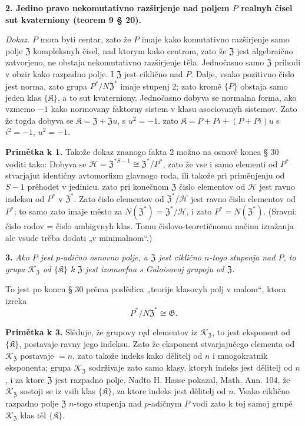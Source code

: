 \documentclass[11pt]{article}
\begin{document}
\noindent\textbf{2. Jedino pravo nekomutativno razširjenje nad poljem \(P\) realnyh čisel sut kvaterniony (teorem 9 § 20).}

\noindent\emph{Dokaz.} \(P\) mora byti centar, zato že \(P\) imaje kako komutativno razširjenje samo polje \(\mathfrak Z\) kompleksnyh čisel, nad ktorym kako centrom, zato že \(\mathfrak Z\) jest algebraično zatvorjeno, ne obstaja nekomutativno razširjenje těla. Jednočasno samo \(\mathfrak Z\) prihodi v obzir kako razpadno polje. I \(\mathfrak Z\) jest ciklično nad \(P\). Dalje, vsako pozitivno čislo jest norma, zato grupa \(P^*/N\mathfrak Z^*\) imaje stupenj 2; zato kromě \(\{P\}\) obstaja samo jeden klas \(\{\mathfrak K\}\), a to sut kvaterniony. Jednočasno dobyva se normalna forma, ako vzmemo \(-1\) kako normovany faktorny sistem v klasu asociovanyh sistemov. Zato že togda dobyva se \(\mathfrak K=\mathfrak Z+\mathfrak Zu\), s \(u^2=-1\). zato \(\mathfrak K=P+Pi+(P+Pi)u\) s \(i^2=-1\), \(u^2=-1\).

\noindent\textbf{Primětka k 1.} Takože dokaz znanogo fakta 2 možno na osnově konca § 30 voditi tako: Dobyva se \(\mathscr H=\mathfrak Z^{*S-1}\cong\mathfrak Z^*/P^*\), zato že vse i samo elementi od \(P^*\) stvarjajut identičny avtomorfizm glavnogo roda, ili takože pri priměnjenju od \(S-1\) prěhodet v jedinicu. zato pri konečnom \(\mathfrak Z\) čislo elementov od \(\mathscr H\) jest ravno indeksu od \(P^*\) v \(\mathfrak Z^*\). Zato čislo elementov od \(\mathfrak Z^*/\mathscr H\) jest ravno čislu elementov od \(P^*\); to samo zato imaje město za \(N(\mathfrak Z^*)=\mathfrak Z^*/\mathscr H\), i zato \(P^*=N(\mathfrak Z^*)\). (Sravni: čislo rodov = čislo ambigvnyh klas. Tomu čislovo-teoretičnomu načinu izražanja ale vsude trěba dodati „v minimalnom“.)

\noindent\textbf{3.} \emph{Ako \(P\) jest \(p\)-adično osnovno polje, a \(\mathfrak Z\) jest ciklično \(n\)-togo stupenja nad \(P\), to grupa \(\mathscr K_{\mathfrak Z}\) od \(\{\mathfrak K\}\) k \(\mathfrak Z\) jest izomorfna s Galoisovoj grupoju od \(\mathfrak Z\).}

To jest po koncu § 30 prěma poslědica „teorije klasovyh polj v malom“, ktora izreka
\[
P^*/N\mathfrak Z^*\cong\mathfrak G.
\]

\noindent\textbf{Primětka k 3.} Slěduje, že grupovy ręd elementov iz \(\mathscr K_{\mathfrak Z}\), to jest eksponent od \(\{\mathfrak K\}\), postavaje ravny jego indeksu. Zato že eksponent stvarjajučego elementa od \(\mathscr K_{\mathfrak Z}\) postavaje \(=n\), zato takože indeks kako dělitelj od \(n\) i mnogokratnik eksponenta; grupa \(\mathscr K_{\mathfrak Z}\) sodrživaje zato samo klasy, ktoryh indeks jest dělitelj od \(n\), i za ktore \(\mathfrak Z\) jest razpadno polje. Nadto H. Hasse pokazal, Math. Ann. 104, že \(\mathscr K_{\mathfrak Z}\) sostoji se iz vsih klas \(\{\mathfrak K\}\), za ktore indeks jest dělitelj od \(n\). Vsako ciklično razpadno polje \(\mathfrak Z\) \(n\)-togo stupenja nad \(p\)-adičnym \(P\) vodi zato k toj samoj grupě \(\mathscr K_{\mathfrak Z}\) klas těl \(\{\mathfrak K\}\).
\end{document}
